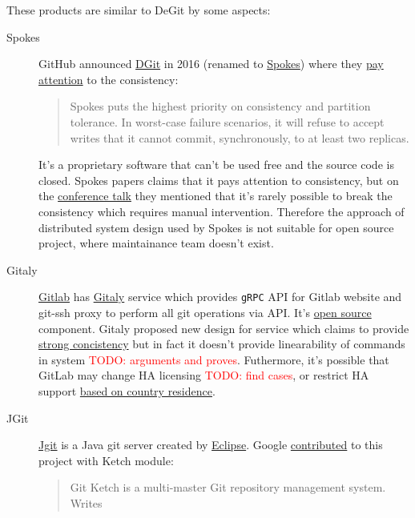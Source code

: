 \documentclass[acmlarge, screen, nonacm, 11pt]{acmart}
\newcommand{\code}[1]{\texttt{#1}}
\newcommand{\todo}[1]{\textcolor{red}{TODO: #1}}
\begin{document}
These products are similar to DeGit by some aspects:
\begin{description}
  \item[Spokes]
    GitHub announced \href{https://github.blog/2016-04-05-introducing-dgit/}{DGit}
    in 2016 (renamed to \href{https://github.blog/2016-09-07-building-resilience-in-spokes/}{Spokes})
    where they \href{https://github.blog/2016-09-07-building-resilience-in-spokes/#defining-resilience}{pay attention}
    to the consistency:
    \begin{quote}
      Spokes puts the highest priority on consistency and partition tolerance.
      In worst-case failure scenarios, it will refuse to accept writes that it cannot commit,
      synchronously, to at least two replicas.
    \end{quote}
    It's a proprietary software that can't be used free and the source code is closed.
    Spokes papers claims that it pays attention to consistency, but on the
    \href{https://www.youtube.com/watch?v=DY0yNRNkYb0}{conference talk} they mentioned that
    it's rarely possible to break the consistency which requires manual intervention.
    Therefore the approach of distributed system design used by Spokes is not suitable for open
    source project, where maintainance team doesn't exist.
  \item[Gitaly]
    \href{https://docs.gitlab.com/ee/README.html}{Gitlab} has
    \href{https://docs.gitlab.com/ee/administration/gitaly/}{Gitaly} service which provides
    \code{gRPC} API for Gitlab website and git-ssh proxy to perform all git operations via API.
    It's \href{https://gitlab.com/gitlab-org/gitaly}{open source} component.
    Gitaly proposed new design for service which claims to provide
    \href{https://gitlab.com/gitlab-org/gitaly/-/blob/master/doc/design\_ha.md\#strong-consistency-design}{strong concistency}
    but in fact it doesn't provide linearability of commands in system \todo{arguments and proves}.
    Futhermore, it's possible that GitLab may change HA licensing \todo{find cases},
    or restrict HA support \href{https://news.ycombinator.com/item?id=21437334}{based on country residence}.
  \item[JGit]
    \href{https://www.eclipse.org/jgit/}{Jgit} is a Java git server created by \href{https://www.eclipse.org/}{Eclipse}.
    Google \href{https://www.eclipse.org//lists/jgit-dev/msg03073.html}{contributed} to this project with Ketch module:
    \begin{quote}
      Git Ketch is a multi-master Git repository management system. Writes

\end{quote}
\end{description}
\end{document}

